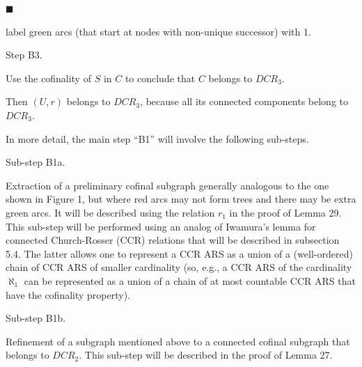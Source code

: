\documentclass[10pt,a4paper]{amsart}
\begin{document}
 
 
\par\noindent  $\blacksquare$ 
 
label green arcs (that start at nodes with non-unique successor) with 1.\par
 
 
  
  Step B3.  
 
Use the cofinality of $S$ in $C$ to conclude that $C$ belongs to $DCR_{3}$.\par
 
   
   
Then $(U,r)$ belongs to $DCR_{3}$, because all its connected components belong to $DCR_{3}$.\par
 
 
 
In more detail, the main step “B1” will involve the following sub-steps.\par
  Sub-step B1a.  
 
Extraction of a preliminary cofinal subgraph generally analogous to the one shown in Figure 1, but where red arcs may not form trees and there may be extra green arcs. It will be described using the relation $r_{1}$ in the proof of Lemma 29. This sub-step will be performed using an analog of Iwamura’s lemma for connected Church-Rosser (CCR) relations that will be described in subsection 5.4. The latter allows one to represent a CCR ARS as a union of a (well-ordered) chain of CCR ARS of smaller cardinality (so, e.g., a CCR ARS of the cardinality $\aleph_{1}$ can be represented as a union of a chain of at most countable CCR ARS that have the cofinality property).\par
 
  Sub-step B1b.  
 
Refinement of a subgraph mentioned above to a connected cofinal subgraph that belongs to $DCR_{2}$. This sub-step will be described in the proof of Lemma 27.\par
 
   
 
  
\end{document}
